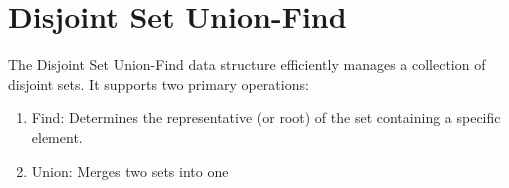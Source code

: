 \section*{Disjoint Set Union-Find}
    The Disjoint Set Union-Find data structure efficiently manages a collection of disjoint sets. It supports two primary operations:  
    
    \begin{enumerate}
        \item Find: Determines the representative (or root) of the set containing a specific element.
        \item Union: Merges two sets into one
    \end{enumerate}